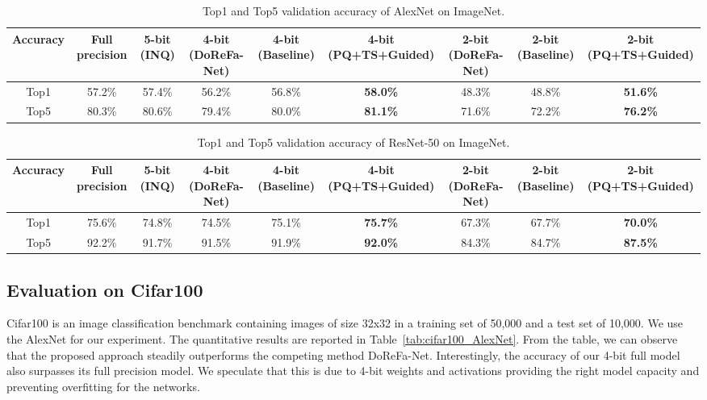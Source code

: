 \begin{table*}[!tbp]
		\centering
		\scalebox{0.7}
		{
			\begin{tabular}{c c c | c c c | c c c }
				\hline
                 Accuracy & Full precision &5-bit (INQ) &4-bit (DoReFa-Net)  & 4-bit (Baseline)  & 4-bit (PQ+TS+Guided) &2-bit (DoReFa-Net) &2-bit (Baseline) & 2-bit (PQ+TS+Guided)\\\hline
                 Top1 &57.2\%  &57.4\%  &56.2\%  &56.8\%  &\bf{58.0}\%  &48.3\%  &48.8\%  &\bf{51.6}\% \\
                 Top5 &80.3\%  &80.6\%  &79.4\% &80.0\% &\bf{81.1}\% &71.6\%  &72.2\%  &\bf{76.2}\%  \\\hline

			\end{tabular}}
			\caption{Top1 and Top5 validation accuracy of AlexNet on ImageNet.}
			\label{tab:AlexNet}
\end{table*}

\begin{table*}[!tbp]
	\centering
	\scalebox{0.7}
	{
		\begin{tabular}{c c c| c c c | c c c }
			\hline
			Accuracy & Full precision &5-bit (INQ) &4-bit (DoReFa-Net) & 4-bit (Baseline)  & 4-bit (PQ+TS+Guided) &2-bit (DoReFa-Net) &2-bit (Baseline) & 2-bit (PQ+TS+Guided)\\\hline
			Top1 &75.6\%  &74.8\%  &74.5\%  &75.1\%  &\bf{75.7}\%  &67.3\%  &67.7\%  &\bf{70.0}\%  \\
			Top5 &92.2\%  &91.7\%  &91.5\%  &91.9\%  &\bf{92.0}\% &84.3\% &84.7\%  &\bf{87.5}\%  \\\hline

		\end{tabular}}
		\caption{Top1 and Top5 validation accuracy of ResNet-50 on ImageNet.}
		\label{tab:ResNet-50}
	\end{table*}


\subsection{Evaluation on Cifar100}
Cifar100 is an image classification benchmark containing images of size 32x32 in a training set of 50,000 and
a test set of 10,000. We use the AlexNet for our experiment. The quantitative results are reported in  Table~\ref{tab:cifar100_AlexNet}. From the table, we can observe that the proposed approach steadily outperforms the competing method DoReFa-Net. Interestingly, the accuracy of our 4-bit full model also surpasses its full precision model. We speculate that this is due to 4-bit weights and activations providing the right model capacity and preventing overfitting for the networks.

